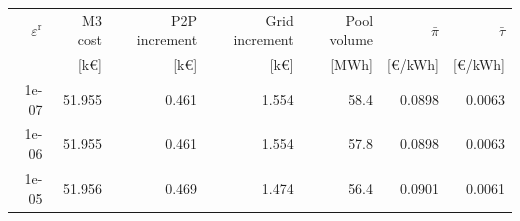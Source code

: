 \begin{tabular*}{\textwidth}{@{\extracolsep{\fill}}rrrrrrr@{}}
\toprule
$\varepsilon^{\mathrm r}$ & M3 cost & P2P increment & Grid increment & Pool volume & $\bar\pi$ & $\bar\tau$ \\
 & [k\euro] & [k\euro] & [k\euro] & [MWh] & [\euro/kWh] & [\euro/kWh] \\
\midrule
1e-07 & 51.955 & 0.461 & 1.554 & 58.4 & 0.0898 & 0.0063 \\
1e-06 & 51.955 & 0.461 & 1.554 & 57.8 & 0.0898 & 0.0063 \\
1e-05 & 51.956 & 0.469 & 1.474 & 56.4 & 0.0901 & 0.0061 \\
\bottomrule
\end{tabular*}
